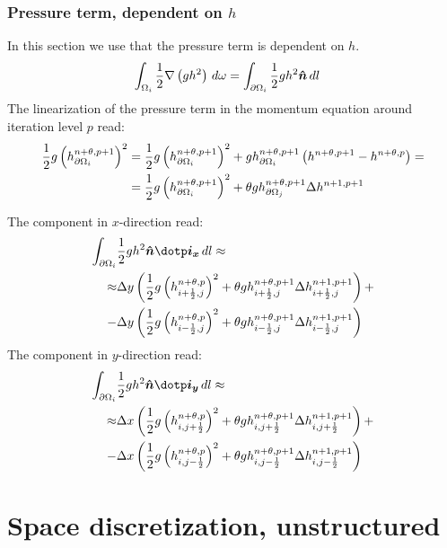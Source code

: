 \subsubsection{Pressure term, dependent on $h$}
In this section we use that the pressure term is dependent on $h$.
\begin{align}
    \int_{\Omega_i} \frac{1}{2}  \nabla \left( g h^2\right) \, d\omega & =
    \int_{\partial\Omega_i} \frac{1}{2}  g h^2 \mbox{\boldmath $\hat n$}\, dl \label{eq:2d_press_term}
\end{align}
The linearization of the pressure term in the momentum equation around iteration level $p$ read:
\begin{align}
    \frac{1}{2} g \left(h^{n+\theta,p+1}_{\partial\Omega_i}\right)^2  & =
    \frac{1}{2} g \left(h^{n+\theta,p+1}_{\partial\Omega_i}\right)^2
    + g h^{n+\theta,p+1}_{\partial\Omega_i} \left({h}^{n+\theta,p+1} - {h}^{n+\theta,p}\right) =
    \\
    & = \frac{1}{2} g \left(h^{n+\theta,p+1}_{\partial\Omega_i}\right)^2 + \theta  g h^{n+\theta,p+1}_{\partial\Omega_j} \Delta {h}^{n+1,p+1}
\end{align}

The component in $x$-direction read:
\begin{align}
    \int_{\partial\Omega_i} & \half  g h^2 \vec{\hat n} \dotp \vec{i_x}\, dl \approx
    \nonumber \\
    \approx  & \Dy \left( \half g \left(h^{n+\theta,p}_{i+\half,j}\right)^2 + \theta  g h^{n+\theta,p+1}_{i+\half,j} \Delta {h}^{n+1,p+1}_{i+\half,j}  \right) +
    \nonumber \\
    - & \Dy \left( \half g \left(h^{n+\theta,p}_{i-\half,j}\right)^2 + \theta  g h^{n+\theta,p+1}_{i-\half,j} \Delta {h}^{n+1,p+1}_{i-\half,j}  \right)
\end{align}
The component in $y$-direction read:
\begin{align}
    \int_{\partial\Omega_i} & \half  g h^2 \vec{\hat n} \dotp \vec{i_y}\, dl \approx
    \nonumber \\
    \approx  & \Dx \left( \half g \left(h^{n+\theta,p}_{i,j+\half}\right)^2 + \theta  g h^{n+\theta,p+1}_{i,j+\half} \Delta {h}^{n+1,p+1}_{i,j+\half}  \right) +
    \nonumber \\
    - & \Dx \left( \half g \left(h^{n+\theta,p}_{i,j-\half}\right)^2 + \theta  g h^{n+\theta,p+1}_{i,j-\half} \Delta {h}^{n+1,p+1}_{i,j-\half}  \right)
\end{align}
\section{Space discretization, unstructured}
\notyet
